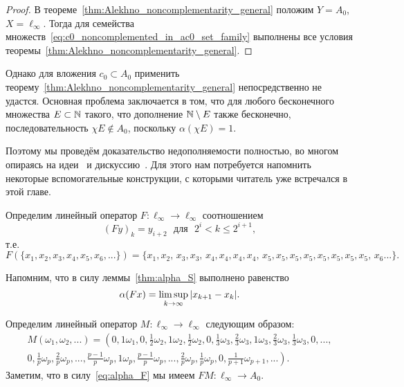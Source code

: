 \begin{proof}
	В теореме~\ref{thm:Alekhno_noncomplementarity_general}
	положим $Y=A_0$, $X=\ell_\infty$.
	Тогда для семейства множеств~\eqref{eq:c0_noncomplemented_in_ac0_set_family}
	выполнены все условия теоремы~\ref{thm:Alekhno_noncomplementarity_general}.
\end{proof}

Однако для вложения $c_0 \subset A_0$ применить теорему~\ref{thm:Alekhno_noncomplementarity_general}
непосредственно не удастся.
Основная проблема заключается в том, что для любого бесконечного множества $E \subset \mathbb{N}$ такого, что
дополнение $\mathbb{N} \setminus E$ также бесконечно, последовательность $\chi E \notin A_0$,
поскольку $\alpha(\chi E) = 1$.

Поэтому мы проведём доказательство недополняемости полностью,
во многом опираясь на идеи~\cite{whitley1968projecting} и дискуссию~\cite{mathSE_Phillips}.
Для этого нам потребуется напомнить некоторые вспомогательные конструкции,
с которыми читатель уже встречался в этой главе.


Определим линейный оператор  $F:\ell_\infty \to \ell_\infty$ соотношением
\begin{equation}
	\label{operator_F}
	(Fy)_k = y_{i+2} \mbox{ ~для~ } 2^i < k \leq 2^{i+1}
	,
\end{equation}
т.е.
\begin{equation}
	F(\{x_1,x_2,x_3,x_4,x_5,x_6, ...\}) = \{x_1,x_2,\,x_3,x_3,\,x_4,x_4,x_4,x_4,\,x_5,x_5,x_5,x_5,x_5,x_5,x_5,x_5,\,x_6...\}
	.
\end{equation}

Напомним, что в силу леммы~\ref{thm:alpha_S} выполнено равенство
\begin{equation}
	\label{eq:alpha_F}
	\alpha(Fx) = \varlimsup_{k\to\infty} |x_{k+1} - x_{k}|
	.
\end{equation}


Определим линейный оператор $M:\ell_\infty \to \ell_\infty$ следующим образом:
\begin{multline*}
	M(\omega_1,\omega_2,...)=\left(
		0, 1\omega_1,
		0, \frac{1}{2}\omega_2, 1\omega_2, \frac{1}{2}\omega_2,
		0, \frac{1}{3}\omega_3, \frac{2}{3}\omega_3, 1\omega_3, \frac{2}{3}\omega_3, \frac{1}{3}\omega_3,
		0, ...,
	\right. \\ \left.
		0, \frac{1}{p}\omega_p, \frac{2}{p}\omega_p, ..., \frac{p-1}{p}\omega_p, 1\omega_p,
			\frac{p-1}{p}\omega_p, ..., \frac{2}{p}\omega_p, \frac{1}{p}\omega_p,
		0, \frac{1}{p+1}\omega_{p+1}, ...
	\right)
	.
\end{multline*}
Заметим, что в силу~\eqref{eq:alpha_F} мы имеем $FM: \ell_\infty \to A_0$.


